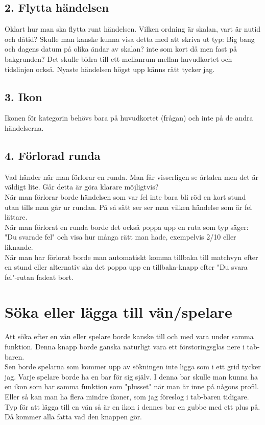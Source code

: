 \documentclass[11pt,a4paper]{article}
\begin{document}
\subsection{2. Flytta händelsen}
Oklart hur man ska flytta runt händelsen. Vilken ordning är skalan, vart är nutid och dåtid? Skulle man kanske kunna visa detta med att skriva ut typ: Big bang och dagens datum på olika ändar av skalan? inte som kort då men fast på bakgrunden? Det skulle bidra till ett mellanrum mellan huvudkortet och tidslinjen också. Nyaste händelsen högst upp känns rätt tycker jag.

\subsection{3. Ikon} 
Ikonen för kategorin behövs bara på huvudkortet (frågan) och inte på de andra händelserna.

\subsection{4. Förlorad runda}
Vad händer när man förlorar en runda. Man får visserligen se årtalen men det är väldigt lite. Går detta är göra klarare möjligtvis?\\
När man förlorar borde händelsen som var fel inte bara bli röd en kort stund utan tills man går ur rundan. På så sätt ser ser man vilken händelse som är fel lättare. \\
När man förlorat en runda borde det också poppa upp en ruta som typ säger: "Du svarade fel" och visa hur många rätt man hade, exempelvis 2/10 eller liknande.\\
När man har förlorat borde man automatiskt komma tillbaka till matchvyn efter en stund eller alternativ ska det poppa upp en tillbaka-knapp efter "Du svara fel"-rutan fadeat bort.

\section{Söka eller lägga till vän/spelare}
Att söka efter en vän eller spelare borde kanske till och med vara under samma funktion. Denna knapp borde ganska naturligt vara ett förstoringsglas nere i tab-baren.\\ 
Sen borde spelarna som kommer upp av sökningen inte ligga som i ett grid tycker jag. Varje spelare borde ha en bar för sig själv. I denna bar skulle man kunna ha en ikon som har samma funktion som "plusset" när man är inne på någons profil. Eller så kan man ha flera mindre ikoner, som jag föreslog i tab-baren tidigare. Typ för att lägga till en vän så är en ikon i dennes bar en gubbe med ett plus på. Då kommer alla fatta vad den knappen gör.
\end{document}
